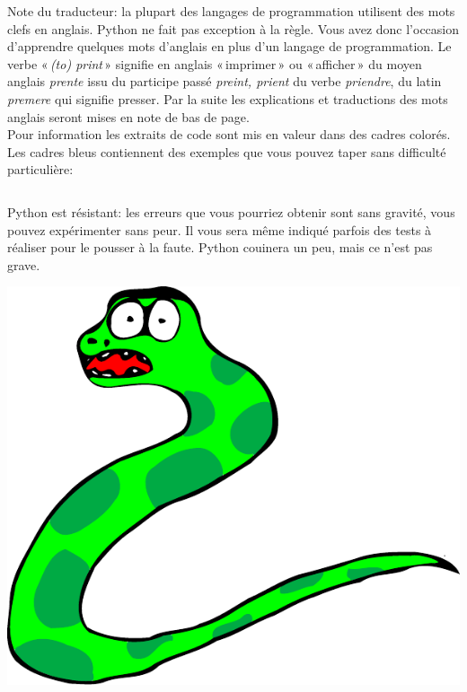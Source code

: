 Note du traducteur: la plupart des langages de programmation utilisent des mots clefs en anglais. Python ne fait pas exception à la règle. Vous avez donc l'occasion d'apprendre quelques mots d'anglais en plus d'un langage de programmation. Le verbe « \emph{(to) print} » signifie en anglais « imprimer » ou « afficher » du moyen anglais \emph{prente} issu du participe passé \emph{preint, prient} du verbe \emph{priendre}, du latin \emph{premere} qui signifie presser. Par la suite les explications et traductions des mots anglais seront mises en note de bas de page.\\

Pour information les extraits de code sont mis en valeur dans des cadres colorés. 
Les cadres bleus contiennent des exemples que vous pouvez taper sans difficulté particulière:

\begin{Verbatim}[frame=single,rulecolor=\color{mbleu}, label=à taper]

\end{Verbatim}

Python est résistant: les erreurs que vous pourriez obtenir sont sans gravité, vous pouvez expérimenter sans peur.
Il vous sera même indiqué parfois des tests à réaliser pour le pousser à la faute. Python couinera un peu, mais ce n'est pas grave.


\begin{center}
\includegraphics[scale=0.5]{images/serpent}
\end{center}

